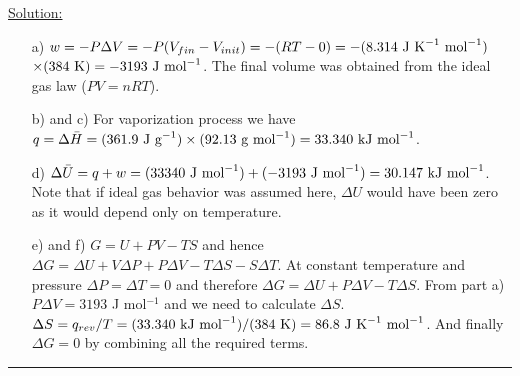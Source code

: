 \noindent
\underline{Solution:}\\

\begin{itemize}

\item[a)] $w = -P\Delta V = -P(V_{fin} - V_{init}) = -(RT - 0) = -(8.314\textnormal{ J K}^{-1}\textnormal{ mol}^{-1})$ $\times (384\textnormal{ K}) = -3193\textnormal{ J mol}^{-1}$. The final volume was obtained from the ideal gas law ($PV = nRT$).

\item[b) and c)] For vaporization process we have $q = \Delta\bar{H} = (361.9\textnormal{ J g}^{-1})\times (92.13\textnormal{ g mol}^{-1}) = 33.340\textnormal{ kJ mol}^{-1}$.

\item[d)] $\Delta\bar{U} = q + w = (33340\textnormal{ J mol}^{-1}) + (-3193\textnormal{ J mol}^{-1}) = 30.147\textnormal{ kJ mol}^{-1}$. Note that if ideal gas
behavior was assumed here, $\Delta U$ would have been zero as it would depend only on temperature.

\item[e) and f)] $G = U + PV - TS$ and hence $\Delta G = \Delta U + V\Delta P + P\Delta V - T\Delta S - S\Delta T$. At constant temperature and pressure $\Delta P = \Delta T = 0$ and therefore $\Delta G = \Delta U + P\Delta V - T\Delta S$. From part a) $P\Delta V = 3193$ J mol$^{-1}$ and we need to calculate $\Delta S$. $\Delta S = q_{rev} / T = (33.340\textnormal{ kJ mol}^{-1}) / (384\textnormal{ K}) = 86.8\textnormal{ J K}^{-1}\textnormal{ mol}^{-1}$. And finally $\Delta G = 0$ by combining all the required terms.

\end{itemize}

\hrule\vspace{0.5cm}
